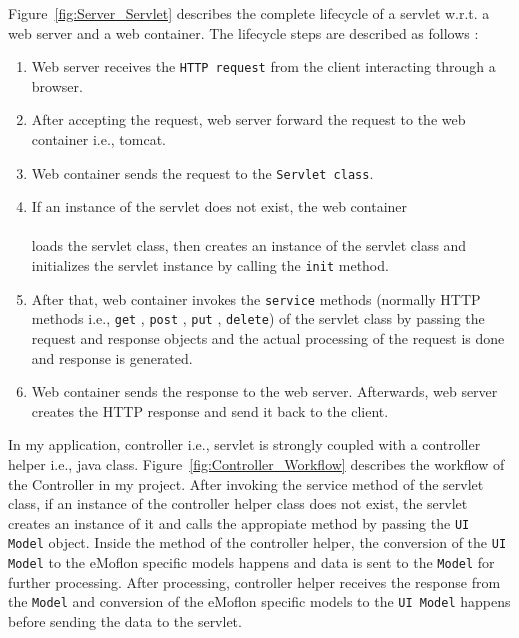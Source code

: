 Figure~\ref{fig:Server_Servlet} describes the complete lifecycle of a servlet w.r.t. a web server and a web container. The lifecycle steps are described as follows \cite{servlet}:
\begin{enumerate}
	\item {Web server receives the \texttt{HTTP request} from the client interacting through a browser.}
	\item {After accepting the request, web server forward the request to the web container i.e., tomcat.}
	\item {Web container sends the request to the \texttt{Servlet class}.}
	\item {If an instance of the servlet does not exist, the web container}\\\\
	loads the servlet class, then creates an instance of the servlet class and initializes the servlet instance by calling the \texttt{init} method.
	\item {After that, web container invokes the \texttt{service} methods (normally HTTP methods i.e., \texttt{get} , \texttt{post} , \texttt{put} , \texttt{delete}) of the servlet class by passing the request and response objects and the actual processing of the request is done and response is generated.}
	\item {Web container sends the response to the web server. Afterwards, web server creates the HTTP response and send it back to the client.}
\end{enumerate}

In my application, controller i.e., servlet is strongly coupled with a controller helper i.e., java class. Figure~\ref{fig:Controller_Workflow} describes the workflow of the Controller in my project. After invoking the service method of the servlet class, if an instance of the controller helper class does not exist, the servlet creates an instance of it and calls the appropiate method by passing the \texttt{UI Model} object. Inside the method of the controller helper, the conversion of the \texttt{UI Model} to the eMoflon specific models happens and data is sent to the \texttt{Model} for further processing. After processing, controller helper receives the response from the \texttt{Model} and conversion of the eMoflon specific models to the \texttt{UI Model} happens before sending the data to the servlet. 

